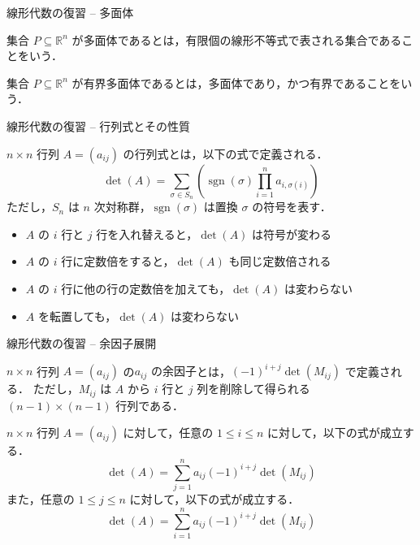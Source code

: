 \documentclass[aspectratio=169]{beamer}
\DeclareMathOperator{\sgn}{sgn}
\begin{document}
\begin{frame}{線形代数の復習 -- 多面体}
	\begin{definition}
		集合 \(P \subseteq \mathbb{R}^n\) が\alert{多面体}であるとは，有限個の線形不等式で表される集合であることをいう．
	\end{definition}

	\begin{definition}
		集合 \(P \subseteq \mathbb{R}^n\) が\alert{有界多面体}であるとは，多面体であり，かつ有界であることをいう．
	\end{definition}
\end{frame}

\begin{frame}{線形代数の復習 -- 行列式とその性質}
	\begin{definition}[行列式]
		\(n \times n\) 行列 \(A = (a_{ij})\) の\alert{行列式}とは，以下の式で定義される．
		\[
			\det(A) = \sum_{\sigma \in S_n} \left( \sgn(\sigma) \prod_{i=1}^{n} a_{i, \sigma(i)} \right)
		\]
		ただし，\(S_n\) は \(n\) 次対称群，\(\sgn(\sigma)\) は置換 \(\sigma\) の符号を表す．
	\end{definition}

	\begin{itemize}
		\item \(A\) の \(i\) 行と \(j\) 行を入れ替えると，\(\det(A)\) は符号が変わる
		\item \(A\) の \(i\) 行に定数倍をすると，\(\det(A)\) も同じ定数倍される
		\item \(A\) の \(i\) 行に他の行の定数倍を加えても，\(\det(A)\) は変わらない
		\item \(A\) を転置しても，\(\det(A)\) は変わらない
	\end{itemize}
\end{frame}

\begin{frame}{線形代数の復習 -- 余因子展開}
	\begin{definition}[余因子]
		\(n \times n\) 行列 \(A = (a_{ij})\) の\alert{\(a_{ij}\) の余因子}とは，\((-1)^{i+j} \det(M_{ij})\) で定義される．
		ただし，\(M_{ij}\) は \(A\) から \(i\) 行と \(j\) 列を削除して得られる \((n-1) \times (n-1)\) 行列である．
	\end{definition}

	\begin{theorem}[余因子展開]
		\(n \times n\) 行列 \(A = (a_{ij})\) に対して，任意の \(1 \leq i \leq n\) に対して，以下の式が成立する．
		\[
			\det(A) = \sum_{j=1}^{n} a_{ij} (-1)^{i+j} \det(M_{ij})
		\]
		また，任意の \(1 \leq j \leq n\) に対して，以下の式が成立する．
		\[
			\det(A) = \sum_{i=1}^{n} a_{ij} (-1)^{i+j} \det(M_{ij})
		\]
	\end{theorem}
\end{frame}
\end{document}
